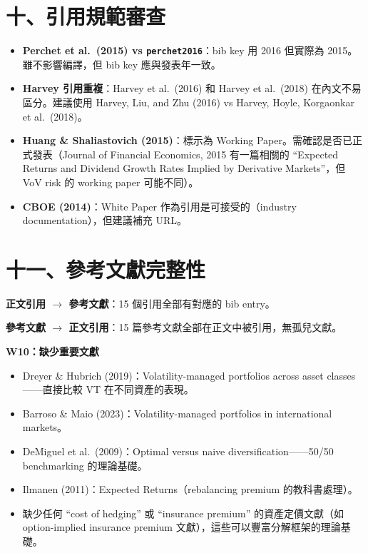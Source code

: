 \documentclass[12pt,a4paper]{article}
\begin{document}
\section*{十、引用規範審查}

\begin{itemize}[leftmargin=2em]
\item \textbf{Perchet et al.\ (2015) vs \texttt{perchet2016}}：bib key 用 2016 但實際為 2015。雖不影響編譯，但 bib key 應與發表年一致。
\item \textbf{Harvey 引用重複}：Harvey et al.\ (2016) 和 Harvey et al.\ (2018) 在內文不易區分。建議使用 Harvey, Liu, and Zhu (2016) vs Harvey, Hoyle, Korgaonkar et al.\ (2018)。
\item \textbf{Huang \& Shaliastovich (2015)}：標示為 Working Paper。需確認是否已正式發表（Journal of Financial Economics, 2015 有一篇相關的 ``Expected Returns and Dividend Growth Rates Implied by Derivative Markets''，但 VoV risk 的 working paper 可能不同）。
\item \textbf{CBOE (2014)}：White Paper 作為引用是可接受的（industry documentation），但建議補充 URL。
\end{itemize}

\section*{十一、參考文獻完整性}

\textbf{正文引用 $\rightarrow$ 參考文獻}：15 個引用全部有對應的 bib entry。

\textbf{參考文獻 $\rightarrow$ 正文引用}：15 篇參考文獻全部在正文中被引用，無孤兒文獻。

\textcolor{warncolor}{\textbf{W10：缺少重要文獻}}

\begin{itemize}[leftmargin=2em]
\item Dreyer \& Hubrich (2019)：Volatility-managed portfolios across asset classes——直接比較 VT 在不同資產的表現。
\item Barroso \& Maio (2023)：Volatility-managed portfolios in international markets。
\item DeMiguel et al.\ (2009)：Optimal versus naive diversification——50/50 benchmarking 的理論基礎。
\item Ilmanen (2011)：Expected Returns（rebalancing premium 的教科書處理）。
\item 缺少任何 ``cost of hedging'' 或 ``insurance premium'' 的資產定價文獻（如 option-implied insurance premium 文獻），這些可以豐富分解框架的理論基礎。
\end{itemize}
\end{document}

